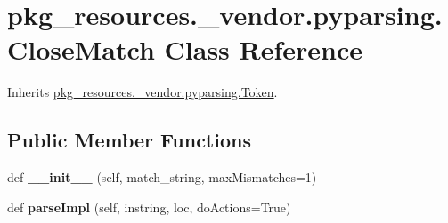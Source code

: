 \hypertarget{classpkg__resources_1_1__vendor_1_1pyparsing_1_1_close_match}{}\section{pkg\+\_\+resources.\+\_\+vendor.\+pyparsing.\+Close\+Match Class Reference}
\label{classpkg__resources_1_1__vendor_1_1pyparsing_1_1_close_match}


Inherits \hyperlink{classpkg__resources_1_1__vendor_1_1pyparsing_1_1_token}{pkg\+\_\+resources.\+\_\+vendor.\+pyparsing.\+Token}.

\subsection*{Public Member Functions}
\begin{DoxyCompactItemize}
\item 
\mbox{\label{classpkg__resources_1_1__vendor_1_1pyparsing_1_1_close_match_ae8e321cbc22d9559d53155a0e533acb2}} 
def {\bfseries \+\_\+\+\_\+init\+\_\+\+\_\+} (self, match\+\_\+string, max\+Mismatches=1)
\item 
\mbox{\label{classpkg__resources_1_1__vendor_1_1pyparsing_1_1_close_match_a9a8d036ae102bce8ab97932588087447}} 
def {\bfseries parse\+Impl} (self, instring, loc, do\+Actions=True)
\end{DoxyCompactItemize}
